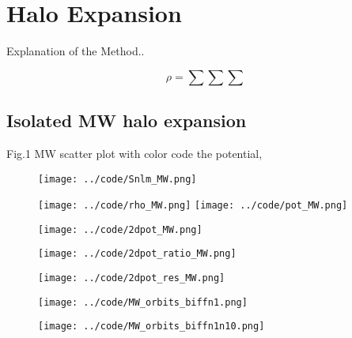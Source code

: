 \section{Halo Expansion}\label{sec:expansion}

Explanation of the Method..


\begin{equation}
\rho = \sum \sum \sum
\end{equation}

\subsection{Isolated MW halo expansion}

Fig.1 MW scatter plot with color code the potential,

\begin{figure}[H]
\centering
\texttt{[image: ../code/Snlm\_MW.png]}
\end{figure}

\begin{figure}[H]
\centering
\texttt{[image: ../code/rho\_MW.png]}
\texttt{[image: ../code/pot\_MW.png]}
\end{figure}

\begin{figure}[H]
\centering
\texttt{[image: ../code/2dpot\_MW.png]}
\end{figure}


\begin{figure}[H]
\centering
\texttt{[image: ../code/2dpot\_ratio\_MW.png]}
\end{figure}


\begin{figure}[H]
\centering
\texttt{[image: ../code/2dpot\_res\_MW.png]}
\end{figure}



\begin{figure}[H]
\centering
\texttt{[image: ../code/MW\_orbits\_biffn1.png]}
\end{figure}


\begin{figure}[H]
\centering
\texttt{[image: ../code/MW\_orbits\_biffn1n10.png]}
\end{figure}



